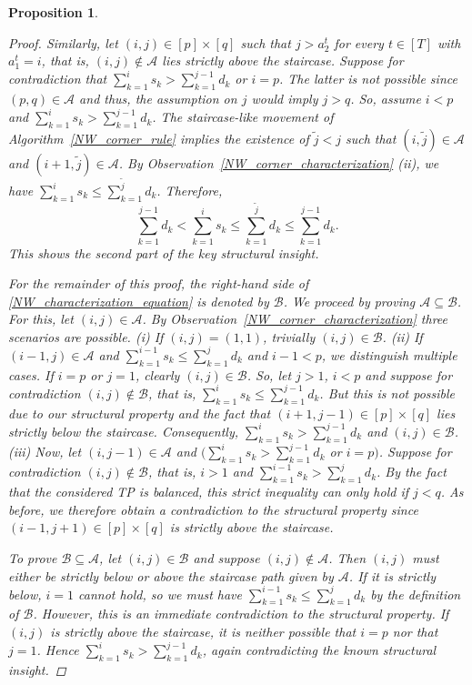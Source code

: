 \documentclass[letterpaper]{article}
\newtheorem{proposition}[theorem]{Proposition}
\begin{document}
\begin{proposition}
\begin{proof}
        Similarly, let $(i, j) \in [p] \times [q]$ such that $j > a_2^t$ for every $t \in [T]$ with $a_1^t = i$, that is, $(i, j) \notin \mathcal{A}$ lies strictly above the staircase. Suppose for contradiction that $\sum_{k=1}^{i} s_k > \sum_{k=1}^{j-1} d_k$ or $i=p$. The latter is not possible since $(p, q) \in \mathcal{A}$ and thus, the assumption on $j$ would imply $j > q$. So, assume $i < p$ and $\sum_{k=1}^{i} s_k > \sum_{k=1}^{j-1} d_k$. The staircase-like movement of Algorithm~\ref{NW_corner_rule} implies the existence of $\tilde{j} < j$ such that $(i, \tilde{j}) \in \mathcal{A}$ and $(i+1, \tilde{j}) \in \mathcal{A}$. By Observation~\ref{NW_corner_characterization} \textit{(ii)}, we have $\sum_{k=1}^{i} s_k \leq \sum_{k=1}^{\tilde{j}} d_k$. Therefore,
        \begin{equation*}
            \sum_{k=1}^{j-1} d_k < \sum_{k=1}^{i} s_k \leq \sum_{k=1}^{\tilde{j}} d_k \leq \sum_{k=1}^{j-1} d_k.
        \end{equation*}
        This shows the second part of the key structural insight.

        For the remainder of this proof, the right-hand side of \eqref{NW_characterization_equation} is denoted by $\mathcal{B}$. We proceed by proving $\mathcal{A} \subseteq \mathcal{B}$. For this, let $(i, j) \in \mathcal{A}$. By Observation~\ref{NW_corner_characterization} three scenarios are possible. \textit{(i)} If $(i, j) = (1, 1)$, trivially $(i, j) \in \mathcal{B}$. \textit{(ii)} If $(i-1, j) \in \mathcal{A}$ and $\sum_{k=1}^{i-1} s_k \leq \sum_{k=1}^{j} d_k$ and $i-1 < p$, we distinguish multiple cases. If $i = p$ or $j = 1$, clearly $(i, j) \in \mathcal{B}$. So, let $j > 1$, $i < p$ and suppose for contradiction $(i, j) \notin \mathcal{B}$, that is, $\sum_{k=1}^{i} s_k \leq \sum_{k=1}^{j-1} d_k$. But this is not possible due to our structural property and the fact that $(i+1, j-1) \in [p] \times [q]$ lies strictly below the staircase. Consequently, $\sum_{k=1}^{i} s_k > \sum_{k=1}^{j-1} d_k$ and $(i, j) \in \mathcal{B}$. \textit{(iii)} Now, let $(i, j-1) \in \mathcal{A}$ and $\bigl(\sum_{k=1}^{i} s_k > \sum_{k=1}^{j-1} d_k$ or $i = p \bigr)$. Suppose for contradiction $(i, j) \notin \mathcal{B}$, that is, $i > 1$ and $\sum_{k=1}^{i-1} s_k > \sum_{k=1}^{j} d_k$. By the fact that the considered TP is balanced, this strict inequality can only hold if $j < q$. As before, we therefore obtain a contradiction to the structural property since $(i-1, j+1) \in [p] \times [q]$ is strictly above the staircase. 

        To prove $\mathcal{B} \subseteq \mathcal{A}$, let $(i, j) \in \mathcal{B}$ and suppose $(i, j) \notin \mathcal{A}$. Then $(i, j)$ must either be strictly below or above the staircase path given by $\mathcal{A}$. If it is strictly below, $i = 1$ cannot hold, so we must have $\sum_{k=1}^{i-1} s_k \leq \sum_{k=1}^{j} d_k$ by the definition of $\mathcal{B}$. However, this is an immediate contradiction to the structural property. If $(i, j)$ is strictly above the staircase, it is neither possible that $i = p$ nor that $j = 1$. Hence $\sum_{k=1}^{i} s_k > \sum_{k=1}^{j-1} d_k$, again contradicting the known structural insight.


\end{proof}
\end{proposition}
\end{document}

